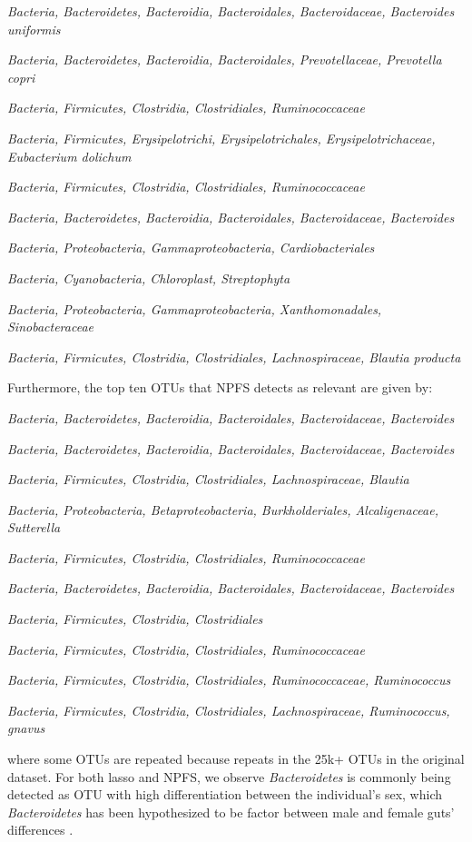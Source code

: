 \documentclass{acm_proc_article-sp}
\begin{document}
\begin{mitemize}
\item {\em Bacteria, Bacteroidetes, Bacteroidia, Bacteroidales, Bacteroidaceae, Bacteroides uniformis}
\item {\em Bacteria, Bacteroidetes, Bacteroidia, Bacteroidales, Prevotellaceae, Prevotella copri}
\item {\em Bacteria, Firmicutes, Clostridia, Clostridiales, Ruminococcaceae}
\item {\em Bacteria, Firmicutes, Erysipelotrichi, Erysipelotrichales, Erysipelotrichaceae, Eubacterium dolichum}
\item {\em Bacteria, Firmicutes, Clostridia, Clostridiales, Ruminococcaceae}
\item {\em Bacteria, Bacteroidetes, Bacteroidia, Bacteroidales, Bacteroidaceae, Bacteroides}
\item {\em Bacteria, Proteobacteria, Gammaproteobacteria, Cardiobacteriales }
\item {\em Bacteria, Cyanobacteria, Chloroplast, Streptophyta}
\item {\em Bacteria, Proteobacteria, Gammaproteobacteria, Xanthomonadales, Sinobacteraceae}
\item {\em Bacteria, Firmicutes, Clostridia, Clostridiales, Lachnospiraceae, Blautia producta}
\end{mitemize}

Furthermore, the top ten OTUs that NPFS detects as relevant are given by:
\begin{mitemize}
\item {\em Bacteria, Bacteroidetes, Bacteroidia, Bacteroidales, Bacteroidaceae, Bacteroides}
\item {\em Bacteria, Bacteroidetes, Bacteroidia, Bacteroidales, Bacteroidaceae, Bacteroides}
\item {\em Bacteria, Firmicutes, Clostridia, Clostridiales, Lachnospiraceae, Blautia}
\item {\em Bacteria, Proteobacteria, Betaproteobacteria, Burkholderiales, Alcaligenaceae, Sutterella}
\item {\em Bacteria, Firmicutes, Clostridia, Clostridiales, Ruminococcaceae}
\item {\em Bacteria, Bacteroidetes, Bacteroidia, Bacteroidales, Bacteroidaceae, Bacteroides}
\item {\em Bacteria, Firmicutes, Clostridia, Clostridiales}
\item {\em Bacteria, Firmicutes, Clostridia, Clostridiales, Ruminococcaceae}
\item {\em Bacteria, Firmicutes, Clostridia, Clostridiales, Ruminococcaceae, Ruminococcus}
\item {\em Bacteria, Firmicutes, Clostridia, Clostridiales, Lachnospiraceae, Ruminococcus, gnavus}
\end{mitemize}
where some OTUs are repeated because repeats in the 25k+ OTUs in the original dataset. For both lasso and NPFS, we observe {\em Bacteroidetes} is commonly being detected as OTU with high differentiation between the individual's sex, which {\em Bacteroidetes} has been hypothesized to be factor between male and female guts' differences \cite{Xu2012MicoB}. 
\end{document}
